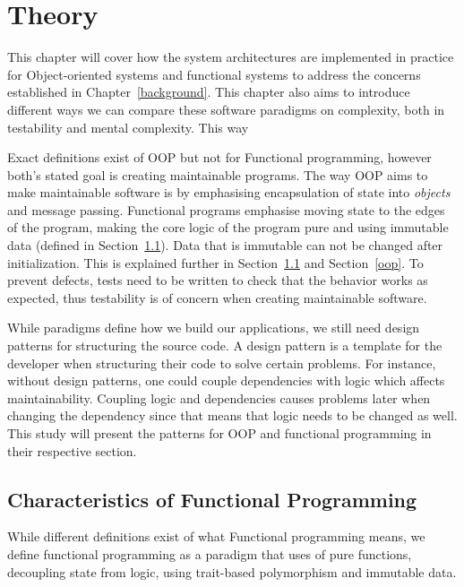 \chapter{Theory}\label{theory} 

This chapter will cover how the system architectures are implemented in practice
for Object-oriented systems and functional systems to address the concerns
established in Chapter~\ref{background}. This chapter also aims to
introduce different ways we can compare these software paradigms on complexity,
both in testability and mental complexity. This way 

Exact definitions exist of OOP but not for Functional programming, however
both's stated goal is creating maintainable programs.  The way OOP aims to make
maintainable software is by emphasising encapsulation of state into
\textit{objects} and message passing. Functional programs emphasise moving state
to the edges of the program, making the core logic of the program pure and using
immutable data (defined in Section~\ref{functionalprogramming}). Data that is
immutable can not be changed after initialization. This is explained further in
Section~\ref{functionalprogramming} and Section~\ref{oop}. To prevent defects,
tests need to be written to check that the behavior works as expected, thus
testability is of concern when creating maintainable software.

While paradigms define how we build our applications, we still need design
patterns for structuring the source code. A design pattern is a template for the
developer when structuring their code to solve certain problems. For instance,
without design patterns, one could couple dependencies with logic which affects
maintainability. Coupling logic and dependencies causes problems later when
changing the dependency since that means that logic needs to be changed as well.
This study will present the patterns for OOP and functional programming in their
respective section. 

\section{Characteristics of Functional Programming}\label{functionalprogramming}

 While different definitions exist of what Functional programming means, we
 define functional programming as a paradigm that uses of pure functions,
 decoupling state from logic, using trait-based polymorphism and
 immutable data.

